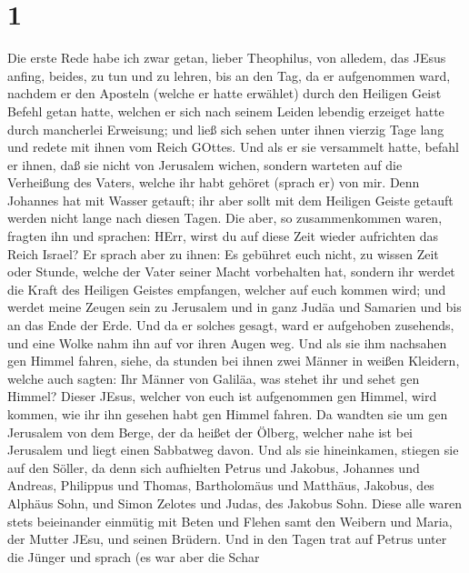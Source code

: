 \hypertarget{section}{%
\section{1}\label{section}}

 Die erste Rede habe ich zwar getan, lieber Theophilus, von
alledem, das JEsus anfing, beides, zu tun und zu lehren, 
bis an den Tag, da er aufgenommen ward, nachdem er den Aposteln (welche
er hatte erwählet) durch den Heiligen Geist Befehl getan hatte,
 welchen er sich nach seinem Leiden lebendig erzeiget hatte
durch mancherlei Erweisung; und ließ sich sehen unter ihnen vierzig Tage
lang und redete mit ihnen vom Reich GOttes.  Und als er sie
versammelt hatte, befahl er ihnen, daß sie nicht von Jerusalem wichen,
sondern warteten auf die Verheißung des Vaters, welche ihr habt gehöret
(sprach er) von mir.  Denn Johannes hat mit Wasser getauft;
ihr aber sollt mit dem Heiligen Geiste getauft werden nicht lange nach
diesen Tagen.  Die aber, so zusammenkommen waren, fragten
ihn und sprachen: HErr, wirst du auf diese Zeit wieder aufrichten das
Reich Israel?  Er sprach aber zu ihnen: Es gebühret euch
nicht, zu wissen Zeit oder Stunde, welche der Vater seiner Macht
vorbehalten hat,  sondern ihr werdet die Kraft des Heiligen
Geistes empfangen, welcher auf euch kommen wird; und werdet meine Zeugen
sein zu Jerusalem und in ganz Judäa und Samarien und bis an das Ende der
Erde.  Und da er solches gesagt, ward er aufgehoben
zusehends, und eine Wolke nahm ihn auf vor ihren Augen weg.
 Und als sie ihm nachsahen gen Himmel fahren, siehe, da
stunden bei ihnen zwei Männer in weißen Kleidern,  welche
auch sagten: Ihr Männer von Galiläa, was stehet ihr und sehet gen
Himmel? Dieser JEsus, welcher von euch ist aufgenommen gen Himmel, wird
kommen, wie ihr ihn gesehen habt gen Himmel fahren.  Da
wandten sie um gen Jerusalem von dem Berge, der da heißet der Ölberg,
welcher nahe ist bei Jerusalem und liegt einen Sabbatweg davon.
 Und als sie hineinkamen, stiegen sie auf den Söller, da
denn sich aufhielten Petrus und Jakobus, Johannes und Andreas, Philippus
und Thomas, Bartholomäus und Matthäus, Jakobus, des Alphäus Sohn, und
Simon Zelotes und Judas, des Jakobus Sohn.  Diese alle
waren stets beieinander einmütig mit Beten und Flehen samt den Weibern
und Maria, der Mutter JEsu, und seinen Brüdern.  Und in den
Tagen trat auf Petrus unter die Jünger und sprach (es war aber die Schar
